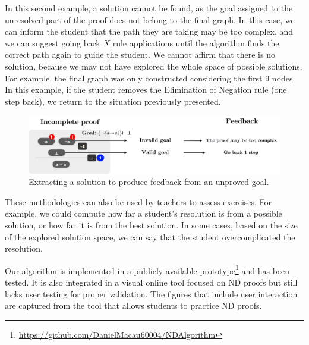 In this second example, a solution cannot be found, as the goal assigned to the unresolved part of the proof does not belong to the final graph. In this case, we can inform the student that the path they are taking may be too complex, and we can suggest going back \(X\) rule applications until the algorithm finds the correct path again to guide the student. We cannot affirm that there is no solution, because we may not have explored the whole space of possible solutions. For example, the final graph was only constructed considering the first 9 nodes. In this example, if the student removes the Elimination of Negation rule (one step back), we return to the situation previously presented.
\begin{figure}[t]
    \centering
    \includegraphics[width=0.9\linewidth]{resources/trim-neg-feed.jpg}
    \caption{Extracting a solution to produce feedback from an unproved goal.}
    \label{fig:extract-solution2}
\end{figure}
These methodologies can also be used by teachers to assess exercises. For example, we could compute how far a student’s resolution is from a possible solution, or how far it is from the best solution. In some cases, based on the size of the explored solution space, we can say that the student overcomplicated the resolution.

Our algorithm is implemented in a publicly available prototype\footnote{\url{https://github.com/DanielMacau60004/NDAlgorithm}} and has been tested. It is also integrated in a visual online tool focused on ND proofs but still lacks user testing for proper validation. The figures that include user interaction are captured from the tool that allows students to practice ND proofs.
